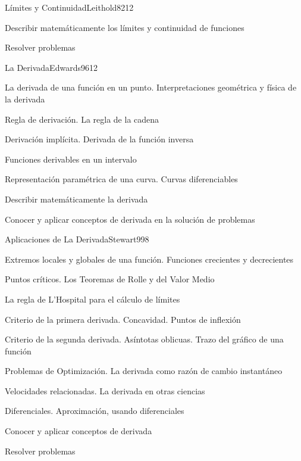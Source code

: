 \begin{syllabus}
\begin{unit}{Límites y Continuidad}{Leithold82}{12}
   \begin{unitgoals}
      \item Describir matemáticamente los límites y continuidad de funciones
	\item Resolver problemas
   \end{unitgoals}
\end{unit}

\begin{unit}{La Derivada}{Edwards96}{12}
\begin{topics}
	\item La derivada de una función en un punto. Interpretaciones geométrica y física de la derivada
	\item Regla de derivación. La regla de la cadena
	\item Derivación implícita. Derivada de la función inversa
	\item Funciones derivables en un intervalo
	\item Representación paramétrica de una curva. Curvas diferenciables
\end{topics}

\begin{unitgoals}
	\item Describir matemáticamente la derivada
	\item Conocer y aplicar conceptos de derivada en la solución de problemas
\end{unitgoals}
\end{unit}

\begin{unit}{Aplicaciones de La Derivada}{Stewart99}{8}
\begin{topics}
	\item Extremos locales y globales de una función. Funciones crecientes y decrecientes
	\item Puntos críticos. Los Teoremas de Rolle y del Valor Medio
	\item La regla de L'Hospital para el cálculo de límites
	\item Criterio de la primera derivada. Concavidad. Puntos de inflexión
	\item Criterio de la segunda derivada. Así­ntotas oblicuas. Trazo del gráfico de una función
	\item Problemas de Optimización. La derivada como razón de cambio instantáneo
	\item Velocidades relacionadas. La derivada en otras ciencias
	\item Diferenciales. Aproximación, usando diferenciales
\end{topics}

\begin{unitgoals}
	\item Conocer y aplicar conceptos de derivada
	\item Resolver problemas
\end{unitgoals}
\end{unit}

\begin{coursebibliography}
\end{coursebibliography}
\end{syllabus}


